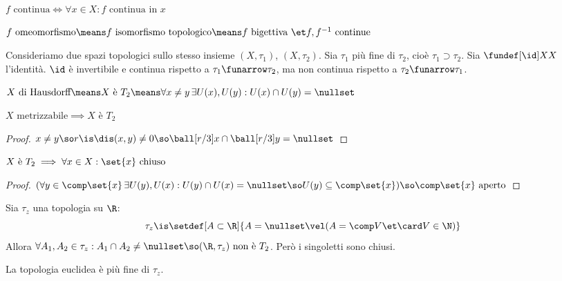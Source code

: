 \begin{prop}
$f\text{ continua}\iff\forall x\in X:f\text{ continua in }x$
\end{prop}

\begin{defn}
$f\text{ omeomorfismo}\means f\text{ isomorfismo topologico}\means f\text{ bigettiva }\et f, f^{-1}\text{ continue}$
\end{defn}

\begin{es}
Consideriamo due spazi topologici sullo stesso insieme $(X,\tau_1)$, $(X,\tau_2)$. Sia $\tau_1$ più fine di $\tau_2$, cioè $\tau_1\supset\tau_2$. Sia $\fundef[\id]XX$ l'identità. $\id$ è invertibile e continua rispetto a $\tau_1\funarrow\tau_2$, ma non continua rispetto a $\tau_2\funarrow\tau_1$.
\end{es}


\begin{defn}
$X\text{ di Hausdorff}\means X\text{ è }T_2\means\forall x\neq y\,\exists U(x),U(y):U(x)\cap U(y)=\nullset$
\end{defn}

\begin{prop}
$X\text{ metrizzabile}\implies X\text{ è }T_2$
\end{prop}
\begin{proof}
$x\neq y\so r\is\dis(x,y)\neq 0\so\ball[r/3]x\cap\ball[r/3]y=\nullset$
\end{proof}

\begin{prop}
$X\text{ è }T_2\implies\forall x\in X:\set{x}\text{ chiuso}$
\end{prop}
\begin{proof}
$(\forall y\in\comp\set{x}\,\exists U(y),U(x):U(y)\cap U(x)=\nullset\so U(y)\subseteq\comp\set{x})\so\comp\set{x}\text{ aperto}$
\end{proof}

\begin{es}
Sia $\tau_z$ una topologia su $\R$:
\[\tau_z\is\setdef[A\subset\R]{A=\nullset\vel(A=\comp V\et\card V\in\N)}\]
Allora $\forall A_1,A_2\in\tau_z:A_1\cap A_2\neq\nullset\so(\R,\tau_z)\text{ non è }T_2$. Però i singoletti sono chiusi.
\end{es}

\begin{oss}
La topologia euclidea è più fine di $\tau_z$.
\end{oss}

